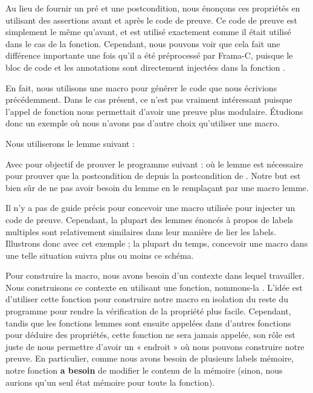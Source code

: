 

Au lieu de fournir un pré et une postcondition, nous énonçons ces propriétés en
utilisant des assertions avant et après le code de preuve. Ce code de preuve est
simplement le même qu'avant, et est utilisé exactement comme il était utilisé dans
le cas de la fonction. Cependant, nous pouvons voir que cela fait une différence
importante une fois qu'il a été préprocessé par Frama-C, puisque le bloc de code
et les annotations sont directement injectées dans la fonction
.




En fait, nous utilisons une macro pour générer le code que nous écrivions
précédemment. Dans le cas présent, ce n'est pas vraiment intéressant puisque
l'appel de fonction nous permettait d'avoir une preuve plus modulaire. Étudions
donc un exemple où nous n'avons pas d'autre choix qu'utiliser une macro.


Nous utiliserons le lemme suivant :




Avec pour objectif de prouver le programme suivant :
où le lemme  est nécessaire pour prouver que la
postcondition de  depuis la postcondition de
. Notre but est bien sûr de ne pas avoir besoin du
lemme en le remplaçant par une macro lemme.


Il n'y a pas de guide précis pour concevoir une macro utilisée pour injecter
un code de preuve. Cependant, la plupart des lemmes énoncés à propos de labels
multiples sont relativement similaires dans leur manière de lier les labels.
Illustrons donc avec cet exemple ; la plupart du temps, concevoir une macro dans
une telle situation suivra plus ou moins ce schéma.


Pour construire la macro, nous avons besoin d'un contexte dans lequel travailler.
Nous construisons ce contexte en utilisant une fonction,
nommons-la . L'idée est d'utiliser
cette fonction pour construire notre macro en isolation du reste du programme pour
rendre la vérification de la propriété plus facile. Cependant, tandis que les
fonctions lemmes sont ensuite appelées dans d'autres fonctions pour déduire
des propriétés, cette fonction ne sera jamais appelée, son rôle est juste de nous
permettre d'avoir un « endroit » où nous pouvons construire notre preuve. En
particulier, comme nous avons besoin de plusieurs labels mémoire, notre fonction
\textbf{a besoin} de modifier le contenu de la mémoire (sinon, nous aurions qu'un
seul état mémoire pour toute la fonction).


